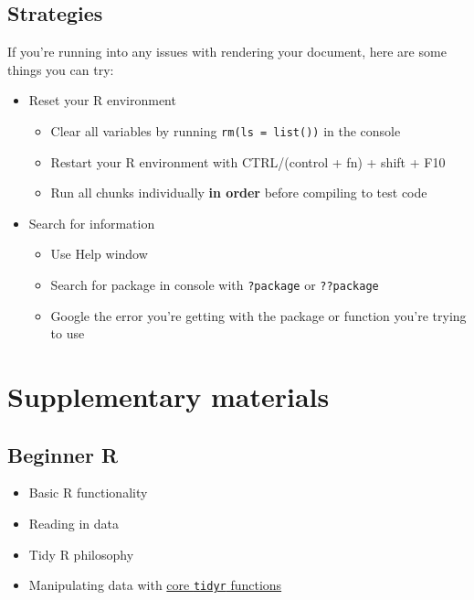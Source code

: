 \documentclass[
]{book}
\providecommand{\tightlist}{%
  \setlength{\itemsep}{0pt}\setlength{\parskip}{0pt}}
\begin{document}
\hypertarget{strategies}{%
\section{Strategies}\label{strategies}}

If you're running into any issues with rendering your document, here are some things you can try:

\begin{itemize}
\tightlist
\item
  Reset your R environment

  \begin{itemize}
  \tightlist
  \item
    Clear all variables by running \texttt{rm(ls\ =\ list())} in the console
  \item
    Restart your R environment with CTRL/(control + fn) + shift + F10
  \item
    Run all chunks individually \textbf{in order} before compiling to test code
  \end{itemize}
\item
  Search for information

  \begin{itemize}
  \tightlist
  \item
    Use Help window
  \item
    Search for package in console with \texttt{?package} or \texttt{??package}
  \item
    Google the error you're getting with the package or function you're trying to use
  \end{itemize}
\end{itemize}

\hypertarget{supplement}{%
\chapter{Supplementary materials}\label{supplement}}

\hypertarget{beginner-r}{%
\section{Beginner R}\label{beginner-r}}

\begin{itemize}
\tightlist
\item
  Basic R functionality
\item
  Reading in data
\item
  Tidy R philosophy
\item
  Manipulating data with \href{https://rstudio.com/wp-content/uploads/2015/02/data-wrangling-cheatsheet.pdf}{core \texttt{tidyr} functions}
\end{itemize}
\end{document}

